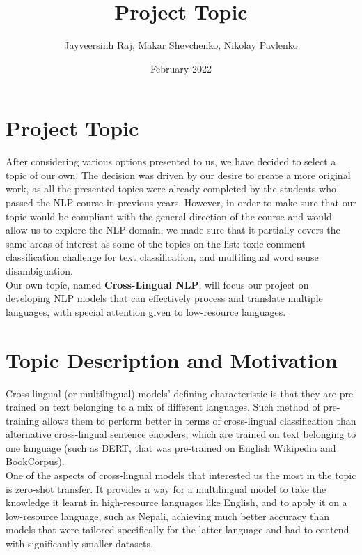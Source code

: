 \documentclass[]{article}
\title{Project Topic}
\author{Jayveersinh Raj, Makar Shevchenko, Nikolay Pavlenko}
\date{February 2022}
\begin{document}
	
	\maketitle
	
	\section{Project Topic}
	
	After considering various options presented to us, we have decided to select a topic of our own. The decision was driven by our desire to create a more original work, as all the presented topics were already completed by the students who passed the NLP course in previous years. However, in order to make sure that our topic would be compliant with the general direction of the course and would allow us to explore the NLP domain, we made sure that it partially covers the same areas of interest as some of the topics on the list: toxic comment classification challenge for text classification, and multilingual word sense disambiguation.\\ Our own topic, named \textbf{Cross-Lingual NLP},  will focus our project on developing NLP models that can effectively process and translate multiple languages, with special attention given to low-resource languages. 
	
	\section{Topic Description and Motivation}
	
	Cross-lingual (or multilingual) models' defining characteristic is that they are pre-trained on text belonging to a mix of different languages. Such method of pre-training allows them to perform better in terms of cross-lingual classification than alternative cross-lingual sentence encoders, which are trained on text belonging to one language (such as BERT, that was pre-trained on English Wikipedia and BookCorpus). \\
	One of the aspects of cross-lingual models that interested us the most in the topic is zero-shot transfer. It provides a way for a multilingual model to take the knowledge it learnt in high-resource languages like English, and to apply it on a low-resource language, such as Nepali, achieving much better accuracy than models that were tailored specifically for the latter language and had to contend with significantly smaller datasets. 
	
	
\end{document}
